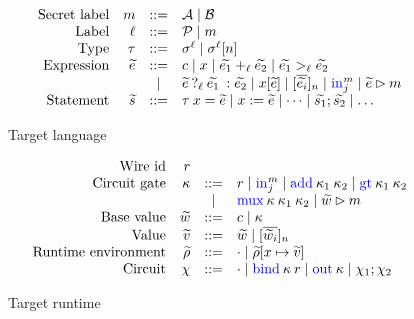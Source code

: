 \begin{figure}
  \small
  \[
  \begin{array}{rrcl}
    \ftext{Secret label} & m &::=& \mathcal{A} \mid \mathcal{B}\\
    \ftext{Label} & \ell &::=& \mathcal{P} \mid m\\
    \ftext{Type} & \tau &::=& \sigma^{\ell} \mid \sigma^{\ell}[n]\\
    \ftext{Expression} & \widetilde{e} &::=& c \mid x \mid \widetilde{e_{1}} +_{\ell} \widetilde{e_{2}} \mid \widetilde{e_{1}} >_{\ell} \widetilde{e_{2}} \\
    & & \mid & \lcond{\ell}{{\widetilde{e}}}{{\widetilde{e_{1}}}}{{\widetilde{e_{2}}}} \mid x[\widetilde{e}] \mid [\overline{\widetilde{e_{i}}}]_{n} \mid \kw{in}^{m}_{j} \mid \widetilde{e} \rhd m\\
    \ftext{Statement} & \widetilde{s} &::=& \tau\:x = \widetilde{e} \mid x := \widetilde{e} \mid \dots \mid \widetilde{s_{1}}; \widetilde{s_{2}} \mid \dots\\
  \end{array}
  \]
\caption{Target language}
\label{fig:tgtlang}
\end{figure}

\begin{figure}
  \small
  \[
  \begin{array}{rrcl}
    \ftext{Wire id} & r &&\\
    \ftext{Circuit gate} & \kappa & ::= & r \mid \kw{in}^{m}_{j} \mid \kw{add}\:\kappa_{1}\:\kappa_{2} \mid \kw{gt}\:\kappa_{1}\:\kappa_{2}\\
    & & \mid & \kw{mux}\:\kappa\:\kappa_{1}\:\kappa_{2} \mid \widetilde{w} \rhd m\\
    \ftext{Base value} & \widetilde{w} & ::= & c \mid \kappa\\
    \ftext{Value} & \widetilde{v} & ::= & \widetilde{w} \mid [\overline{\widetilde{w}_{i}}]_{n}\\
    \ftext{Runtime environment} & \widetilde{\rho} & ::= & \cdot \mid \widetilde{\rho}[x \mapsto \widetilde{v}]\\
    \ftext{Circuit} & \chi & ::= & \cdot \mid \kw{bind}\:\kappa\:r \mid \kw{out}\:\kappa \mid \chi_{1}; \chi_{2}
  \end{array}
  \]
\caption{Target runtime}
\label{fig:tgtruntime}
\end{figure}



